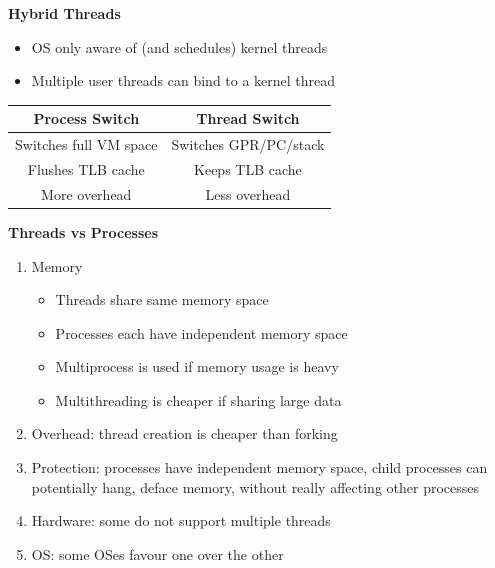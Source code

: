 \documentclass[a4paper, 12pt]{article}
\begin{document}
\begin{multicols*}{4}
\begin{itemize}
\end{itemize}
\textbf{Hybrid Threads}
\begin{itemize}
	\item OS only aware of (and schedules) kernel threads
	\item Multiple user threads can bind to a kernel thread
\end{itemize}
\begin{tabular}{ |c|c| }
    \hline
	\textbf{Process Switch} & \textbf{Thread Switch} \\
	\hline
	Switches full VM space & Switches GPR/PC/stack \\
	Flushes TLB cache & Keeps TLB cache \\
	More overhead & Less overhead \\
	\hline
\end{tabular}
\textbf{Threads vs Processes}
\begin{enumerate}
    \item Memory
    \begin{itemize}
        \item Threads share same memory space
        \item Processes each have independent memory space
        \item Multiprocess is used if memory usage is heavy
        \item Multithreading is cheaper if sharing large data
    \end{itemize}
    \item Overhead: thread creation is cheaper than forking
    \item Protection: processes have independent memory space, child processes can potentially hang, deface memory, without really affecting other processes
    \item Hardware: some do not support multiple threads
    \item OS: some OSes favour one over the other
\end{enumerate}

\medskip


\end{multicols*}
\end{document}
